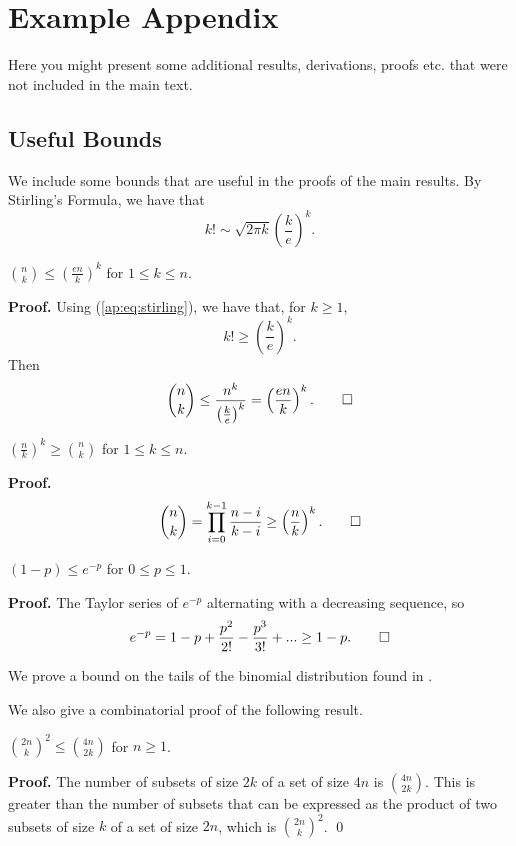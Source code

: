 \chapter{Example Appendix}

Here you might present some additional results, derivations, proofs etc. that were not included in the main text.

\section{Useful Bounds}

We include some bounds that are useful in the proofs of the main results. By Stirling's Formula, we have that
\begin{equation}\label{ap:eq:stirling}
    k! \sim \sqrt{2\pi k}\left(\frac{k}{e}\right)^k.
\end{equation}

\begin{proposition}\label{ap:prop:upperbinom}
    $\binom{n}{k} \leq \left(\frac{en}{k}\right)^k$ for $1 \leq k \leq n$. 
\end{proposition}

\textbf{Proof. } Using (\ref{ap:eq:stirling}), we have that, for $k \geq 1$, 
\[k! \geq \left(\frac{k}{e}\right)^k.\]
Then
\[\binom{n}{k} \leq \frac{n^k}{\left(\frac{k}{e}\right)^k} = \left(\frac{en}{k}\right)^k. \qed\]

\begin{proposition}\label{ap:prop:lowebinom}
    $\left(\frac{n}{k}\right)^k \geq \binom{n}{k}$ for $1 \leq k \leq n$.
\end{proposition}

\textbf{Proof. }
\[\binom{n}{k} = \prod_{i = 0}^{k - 1} \frac{n - i}{k - i} \geq \left(\frac{n}{k}\right)^k. \qed\]

\begin{proposition}\label{ap:prop:exp}
    $(1 - p) \leq e^{-p}$ for $0 \leq p \leq 1$.
\end{proposition}

\textbf{Proof. } The Taylor series of $e^{-p}$ alternating with a decreasing sequence, so
\[e^{-p} = 1 - p + \frac{p^2}{2!} - \frac{p^3}{3!} + ... \geq 1 - p. \qed\]

We prove a bound on the tails of the binomial distribution found in \cite{feller}.

We also give a combinatorial proof of the following result.

\begin{proposition}
    $\binom{2n}{k}^2 \leq \binom{4n}{2k}$ for $n \geq 1$. 
\end{proposition}

\textbf{Proof. } The number of subsets of size $2k$ of a set of size $4n$ is $\binom{4n}{2k}$. This is greater than the number of subsets that can be expressed as the product of two subsets of size $k$ of a set of size $2n$, which is $\binom{2n}{k}^2$. \qed